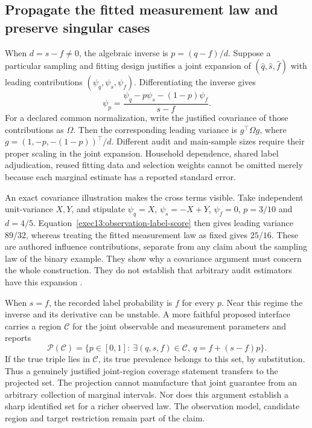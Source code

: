 \subsection{Propagate the fitted measurement law and preserve singular cases}

When $d=s-f\ne0$, the algebraic inverse is $p=(q-f)/d$. Suppose a
particular sampling and fitting design justifies a joint expansion of
$(\widehat q,\widehat s,\widehat f)$ with leading contributions
$(\psi_q,\psi_s,\psi_f)$. Differentiating the inverse gives
\begin{equation}
 \psi_p=\frac{\psi_q-p\psi_s-(1-p)\psi_f}{s-f}.
 \label{exec13:observation-label-score}
\end{equation}
For a declared common normalization, write the justified covariance of
those contributions as $\Omega$. Then the corresponding leading variance
is $g^\top\Omega g$, where
$g=(1,-p,-(1-p))^\top/d$. Different audit and main-sample sizes require
their proper scaling in the joint expansion. Household dependence, shared
label adjudication, reused fitting data and selection weights cannot be
omitted merely because each marginal estimate has a reported standard error.

An exact covariance illustration makes the cross terms visible. Take
independent unit-variance $X,Y$, and stipulate
$\psi_q=X$, $\psi_s=-X+Y$, $\psi_f=0$, $p=3/10$ and $d=4/5$.
Equation~\eqref{exec13:observation-label-score} then gives leading variance
$89/32$, whereas treating the fitted measurement law as fixed gives
$25/16$. These are authored influence contributions, separate from any
claim about the sampling law of the binary example. They show why a
covariance argument must concern the whole construction. They do not
establish that arbitrary audit estimators have this expansion
\citep{exec13_observation_exact}.

When $s=f$, the recorded label probability is $f$ for every $p$.
Near this regime the inverse and its derivative can be unstable. A more
faithful proposed interface carries a region $\mathcal C$ for the joint
observable and measurement parameters and reports
\begin{equation}
 \mathcal P(\mathcal C)=
 \{p\in[0,1]:\ \exists(q,s,f)\in\mathcal C,
                    \ q=f+(s-f)p\}.
 \label{exec13:observation-label-projection}
\end{equation}
If the true triple lies in $\mathcal C$, its true prevalence belongs to
this set, by substitution. Thus a genuinely justified joint-region coverage
statement transfers to the projected set. The projection cannot manufacture
that joint guarantee from an arbitrary collection of marginal intervals.
Nor does this argument establish a sharp identified set for a richer
observed law. The observation model, candidate region and target restriction
remain part of the claim.

